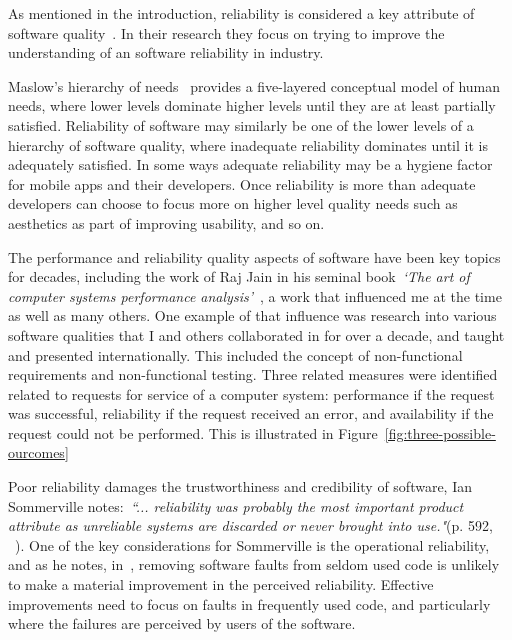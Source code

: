 As mentioned in the introduction, reliability is considered a key attribute of software quality~. In their research they focus on trying to improve the understanding of an software reliability in industry. 

Maslow's hierarchy of needs~ provides a five-layered conceptual model of human needs, where lower levels dominate higher levels until they are at least partially satisfied. Reliability of software may similarly be one of the lower levels of a hierarchy of software quality, where inadequate reliability dominates until it is adequately satisfied. In some ways adequate reliability may be a hygiene factor for mobile apps and their developers. Once reliability is more than adequate developers can choose to focus more on higher level quality needs such as aesthetics as part of improving usability, and so on.

The performance and reliability quality aspects of software have been key topics for decades, including the work of Raj Jain in his seminal book~\emph{`The art of computer systems performance analysis'}~, a work that influenced me at the time as well as many others. One example of that influence was research into various software qualities that I and others collaborated in for over a decade, and taught and presented internationally. This included the concept of non-functional requirements and non-functional testing. Three related measures were identified related to requests for service of a computer system: performance if the request was successful, reliability if the request received an error, and availability if the request could not be performed. This is illustrated in Figure~\ref{fig:three-possible-ourcomes}%

Poor reliability damages the trustworthiness and credibility of software, Ian Sommerville notes:~\emph{``... reliability was probably the most important product attribute as unreliable systems are discarded or never brought into use."}(p. 592, ~). One of the key considerations for Sommerville is the operational reliability, and as he notes, in~, removing software faults from seldom used code is unlikely to make a material improvement in the perceived reliability. Effective improvements need to focus on faults in frequently used code, and particularly where the failures are perceived by users of the software.

